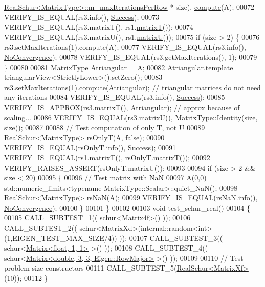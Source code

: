 \begin{DoxyCode}
      \hyperlink{group___eigenvalues___module_class_eigen_1_1_real_schur}{RealSchur<MatrixType>::m\_maxIterationsPerRow} * size).
      \hyperlink{group___eigenvalues___module_a60caf9ffad11d728ea458c4dd36d0a98}{compute}(A);
00072   VERIFY\_IS\_EQUAL(rs3.info(), \hyperlink{group__enums_gga85fad7b87587764e5cf6b513a9e0ee5ea52581b035f4b59c203b8ff999ef5fcea}{Success});
00073   VERIFY\_IS\_EQUAL(rs3.matrixT(), rs1.\hyperlink{group___eigenvalues___module_abb78996b43b8642a5f507415730445cb}{matrixT}());
00074   VERIFY\_IS\_EQUAL(rs3.matrixU(), rs1.\hyperlink{group___eigenvalues___module_a85622ccbecff99c8933d21f0a22b22bb}{matrixU}());
00075   \textcolor{keywordflow}{if} (size > 2) \{
00076     rs3.setMaxIterations(1).compute(A);
00077     VERIFY\_IS\_EQUAL(rs3.info(), \hyperlink{group__enums_gga85fad7b87587764e5cf6b513a9e0ee5eaba1c8763d1179778070f365ecc4157a8}{NoConvergence});
00078     VERIFY\_IS\_EQUAL(rs3.getMaxIterations(), 1);
00079   \}
00080 
00081   MatrixType Atriangular = A;
00082   Atriangular.template triangularView<StrictlyLower>().setZero(); 
00083   rs3.setMaxIterations(1).compute(Atriangular); \textcolor{comment}{// triangular matrices do not need any iterations}
00084   VERIFY\_IS\_EQUAL(rs3.info(), \hyperlink{group__enums_gga85fad7b87587764e5cf6b513a9e0ee5ea52581b035f4b59c203b8ff999ef5fcea}{Success});
00085   VERIFY\_IS\_APPROX(rs3.matrixT(), Atriangular); \textcolor{comment}{// approx because of scaling...}
00086   VERIFY\_IS\_EQUAL(rs3.matrixU(), MatrixType::Identity(size, size));
00087 
00088   \textcolor{comment}{// Test computation of only T, not U}
00089   \hyperlink{group___eigenvalues___module}{RealSchur<MatrixType>} rsOnlyT(A, \textcolor{keyword}{false});
00090   VERIFY\_IS\_EQUAL(rsOnlyT.info(), \hyperlink{group__enums_gga85fad7b87587764e5cf6b513a9e0ee5ea52581b035f4b59c203b8ff999ef5fcea}{Success});
00091   VERIFY\_IS\_EQUAL(rs1.\hyperlink{group___eigenvalues___module_abb78996b43b8642a5f507415730445cb}{matrixT}(), rsOnlyT.matrixT());
00092   VERIFY\_RAISES\_ASSERT(rsOnlyT.matrixU());
00093 
00094   \textcolor{keywordflow}{if} (size > 2 && size < 20)
00095   \{
00096     \textcolor{comment}{// Test matrix with NaN}
00097     A(0,0) = std::numeric\_limits<typename MatrixType::Scalar>::quiet\_NaN();
00098     \hyperlink{group___eigenvalues___module}{RealSchur<MatrixType>} rsNaN(A);
00099     VERIFY\_IS\_EQUAL(rsNaN.info(), \hyperlink{group__enums_gga85fad7b87587764e5cf6b513a9e0ee5eaba1c8763d1179778070f365ecc4157a8}{NoConvergence});
00100   \}
00101 \}
00102 
00103 \textcolor{keywordtype}{void} test\_schur\_real()
00104 \{
00105   CALL\_SUBTEST\_1(( schur<Matrix4f>() ));
00106   CALL\_SUBTEST\_2(( schur<MatrixXd>(internal::random<int>(1,EIGEN\_TEST\_MAX\_SIZE/4)) ));
00107   CALL\_SUBTEST\_3(( schur<\hyperlink{group___core___module_class_eigen_1_1_matrix}{Matrix<float, 1, 1>} >() ));
00108   CALL\_SUBTEST\_4(( schur<\hyperlink{group___core___module_class_eigen_1_1_matrix}{Matrix<double, 3, 3, Eigen::RowMajor>} >() ));
00109 
00110   \textcolor{comment}{// Test problem size constructors}
00111   CALL\_SUBTEST\_5(\hyperlink{group___eigenvalues___module_class_eigen_1_1_real_schur}{RealSchur<MatrixXf>}(10));
00112 \}
\end{DoxyCode}
